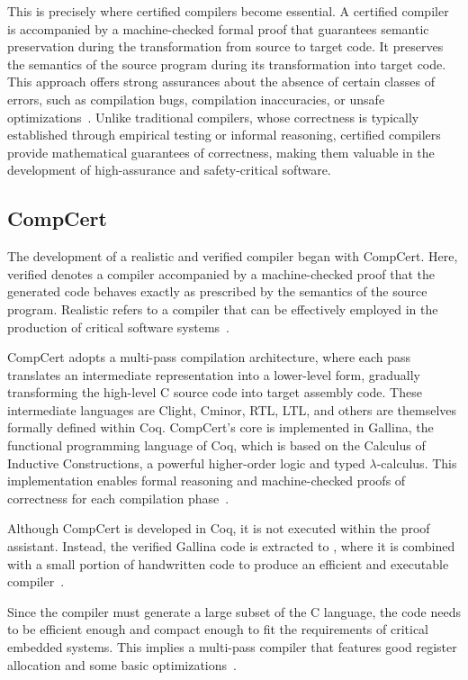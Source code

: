 This is precisely where certified compilers become essential. A certified compiler is accompanied by a machine-checked formal proof 
that guarantees semantic preservation during the transformation from source to target code. It preserves the semantics of the source 
program during its transformation into target code. This approach offers strong assurances about the absence of certain classes of 
errors, such as compilation bugs, compilation inaccuracies, or unsafe optimizations~\cite{Leroy09}. Unlike traditional compilers, 
whose correctness is typically established through empirical testing or informal reasoning, certified compilers provide mathematical 
guarantees of correctness, making them valuable in the development of high-assurance and safety-critical software.

\subsection{CompCert}
\label{sec:CompCert}

The development of a realistic and verified compiler began with CompCert. Here, verified denotes a compiler accompanied by
a machine-checked proof that the generated code behaves exactly as prescribed by the semantics of the source program.
Realistic refers to a compiler that can be effectively employed in the production of critical software systems~\cite{Leroy09-back-end}.

CompCert adopts a multi-pass compilation architecture, where each pass translates an intermediate representation into a lower-level 
form, gradually transforming the high-level C source code into target assembly code. These intermediate languages are Clight, Cminor, 
RTL, LTL, and others are themselves formally defined within Coq. CompCert's core is implemented in Gallina, the functional programming 
language of Coq, which is based on the Calculus of Inductive Constructions, a powerful higher-order logic and typed $\lambda$-calculus. 
This implementation enables formal reasoning and machine-checked proofs of correctness for each compilation phase~\cite{MonniauxB22}.

Although CompCert is developed in Coq, it is not executed within the proof assistant. Instead, the verified Gallina code is extracted 
to \ocaml, where it is combined with a small portion of handwritten \ocaml code to produce an efficient and executable 
compiler~\cite{MonniauxB22}.

Since the compiler must generate a large subset of the C language, the code needs to be eﬃcient enough and compact enough to fit the 
requirements of critical embedded systems. This implies a multi-pass compiler that features good register allocation and some basic 
optimizations~\cite{Leroy09-back-end}.


